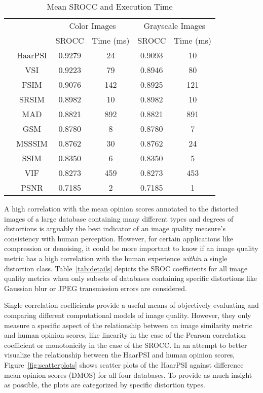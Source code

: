\documentclass[11pt,a4paper]{article}
\begin{document}
\begin{table}[!htb]
  \centering
  \caption{Mean SROCC and Execution Time} 
  \label{tab:overallperf}
\begin{small}
  \begin{tabular}{*{6}{c}}
    \toprule[0.5mm] &  & \multicolumn{2}{c}{Color Images} & \multicolumn{2}{c}{Grayscale Images}\\
    &  & SROCC & Time (ms) & SROCC & Time (ms)\\
& HaarPSI & 0.9279 & 24 & 0.9093 & 10\\
& VSI & 0.9223 & 79 & 0.8946 & 80\\
& FSIM & 0.9076 & 142 & 0.8925 & 121\\
& SRSIM & 0.8982 & 10 & 0.8982 & 10\\
& MAD & 0.8821 & 892 & 0.8821 & 891\\
& GSM & 0.8780 & 8 & 0.8780 & 7\\
& MSSSIM & 0.8762 & 30 & 0.8762 & 24\\
& SSIM & 0.8350 & 6 & 0.8350 & 5\\
& VIF & 0.8273 & 459 & 0.8273 & 453\\
& PSNR & 0.7185 & 2 & 0.7185 & 1\\
    \midrule[0.5mm]
  \end{tabular}
\end{small}
\end{table}

A high correlation with the mean opinion scores annotated to the distorted images of a large database containing many different types and degrees of distortions is arguably the best indicator of an image quality measure's consistency with human perception. However, for certain applications like compression or denoising, it could be more important to know if an image quality metric has a high correlation with the human experience \textit{within} a single distortion class. Table~\ref{tab:details} depicts the SROC coefficients for all image quality metrics when only subsets of databases containing specific distortions like Gaussian blur or JPEG transmission errors are considered. 

Single correlation coefficients provide a useful means of objectively evaluating and comparing different computational models of image quality. However, they only measure a specific aspect of the relationship between an image similarity metric and human opinion scores, like linearity in the case of the Pearson correlation coefficient or monotonicity in the case of the SROCC. In an attempt to better visualize the relationship between the HaarPSI and human opinion scores, Figure~\ref{fig:scatterplots} shows scatter plots of the HaarPSI against difference mean opinion scores (DMOS) for all four databases. To provide as much insight as possible, the plots are categorized by specific distortion types.
\end{document}
